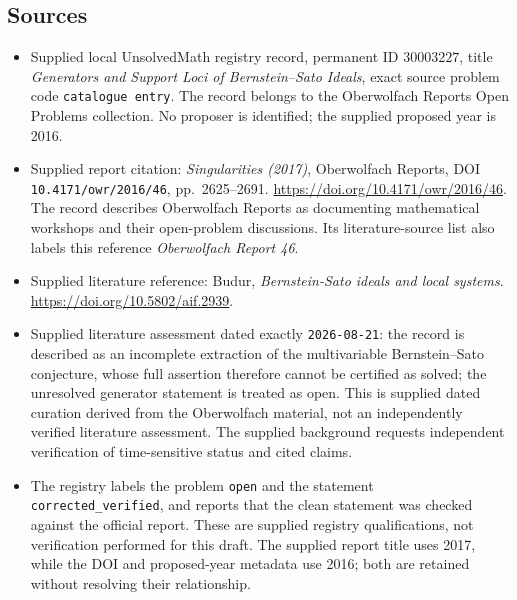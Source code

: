 \documentclass[11pt]{article}
\begin{document}
\subsection{Sources}
\begin{itemize}
\item Supplied local UnsolvedMath registry record, permanent ID \(30003227\), title \emph{Generators and Support Loci of Bernstein--Sato Ideals}, exact source problem code \texttt{catalogue entry}. The record belongs to the Oberwolfach Reports Open Problems collection. No proposer is identified; the supplied proposed year is 2016.
\item Supplied report citation: \emph{Singularities (2017)}, Oberwolfach Reports, DOI \texttt{10.4171/owr/2016/46}, pp.\ 2625--2691. \url{https://doi.org/10.4171/owr/2016/46}. The record describes Oberwolfach Reports as documenting mathematical workshops and their open-problem discussions. Its literature-source list also labels this reference \emph{Oberwolfach Report 46}.
\item Supplied literature reference: Budur, \emph{Bernstein-Sato ideals and local systems}. \url{https://doi.org/10.5802/aif.2939}.
\item Supplied literature assessment dated exactly \texttt{2026-08-21}: the record is described as an incomplete extraction of the multivariable Bernstein--Sato conjecture, whose full assertion therefore cannot be certified as solved; the unresolved generator statement is treated as open. This is supplied dated curation derived from the Oberwolfach material, not an independently verified literature assessment. The supplied background requests independent verification of time-sensitive status and cited claims.
\item The registry labels the problem \texttt{open} and the statement \texttt{corrected\_verified}, and reports that the clean statement was checked against the official report. These are supplied registry qualifications, not verification performed for this draft. The supplied report title uses 2017, while the DOI and proposed-year metadata use 2016; both are retained without resolving their relationship.
\end{itemize}
\end{document}
